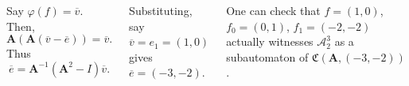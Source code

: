 \documentclass[24pt]{tikzposter}
\theoremstyle{definition}
\begin{document}
\begin{columns}
  {
    Say $\varphi(f) = \overline{v}$. Then, 
    \[ \mathbf{A} (\mathbf{A}(\overline{v} - \overline{e})) = \overline{v} .\]
    Thus 
    \[ \overline{e} = \mathbf{A}^{-1}(\mathbf{A}^2 - I) \overline{v} .\]

    Substituting, say $\overline{v}=e_1=(1,0)$ gives $\overline{e} = (-3,-2)$.

    \bigskip

    One can check that $f = (1,0)$, $f_0 = (0,1)$, $f_1 = (-2,-2)$ 
    actually witnesses $\mathcal{A}^3_2$ as a subautomaton of 
    $\mathfrak{C}(\mathbf{A}, (-3,-2))$.
  }
\end{columns}
\end{document}
